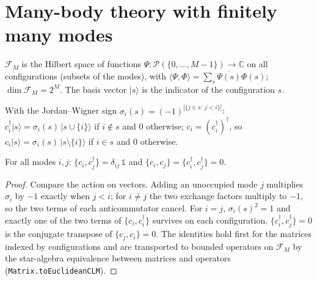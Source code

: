\chapter{Many-body theory with finitely many modes}


\begin{definition}\label{def:fock}
  \leanok
  $\mathcal F_M$ is the Hilbert space of functions $\Psi\colon \mathcal P(\{0,\dots,M-1\})\to\mathbb C$ on all configurations
  (subsets of the modes), with $\langle\Psi,\Phi\rangle=\sum_s\overline{\Psi(s)}\Phi(s)$; $\dim\mathcal F_M = 2^M$.
  The basis vector $|s\rangle$ is the indicator of the configuration $s$.
\end{definition}

\begin{definition}\label{def:cdag}
  \leanok
  With the Jordan–Wigner sign $\sigma_i(s)=(-1)^{|\{j\in s:\ j<i\}|}$:
  $c_i^\dagger|s\rangle=\sigma_i(s)\,|s\cup\{i\}\rangle$ if $i\notin s$ and $0$ otherwise;
  $c_i=(c_i^\dagger)^\dagger$, so $c_i|s\rangle=\sigma_i(s)\,|s\setminus\{i\}\rangle$ if $i\in s$ and $0$ otherwise.
\end{definition}

\begin{theorem}\label{thm:car}
  \leanok
  For all modes $i,j$: $\{c_i,c_j^\dagger\}=\delta_{ij}\,\mathbb 1$ and $\{c_i,c_j\}=\{c_i^\dagger,c_j^\dagger\}=0$.
\end{theorem}
\begin{proof}\leanok
  Compare the action on vectors. Adding an unoccupied mode $j$ multiplies $\sigma_i$ by $-1$ exactly when $j<i$; for
  $i\neq j$ the two exchange factors multiply to $-1$, so the two terms of each anticommutator cancel. For $i=j$,
  $\sigma_i(s)^2=1$ and exactly one of the two terms of $\{c_i,c_i^\dagger\}$ survives on each configuration.
  $\{c_i^\dagger,c_j^\dagger\}=0$ is the conjugate transpose of $\{c_j,c_i\}=0$. The identities hold first for the
  matrices indexed by configurations and are transported to bounded operators on $\mathcal F_M$ by the star-algebra
  equivalence between matrices and operators (\texttt{Matrix.toEuclideanCLM}).
\end{proof}

